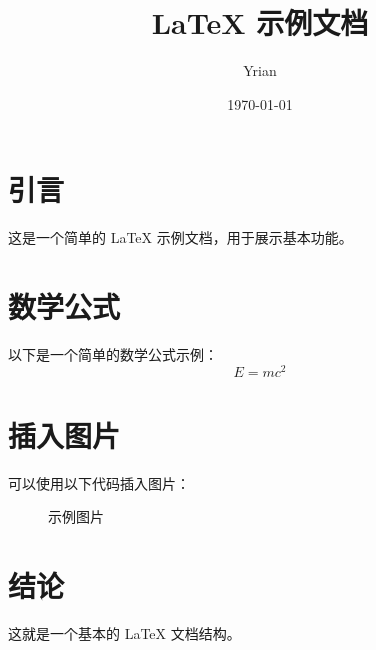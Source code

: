 \documentclass{ctexart}  %
\begin{document}
	\title{LaTeX 示例文档} %
	\author{Yrian}        %
	\date{\today}          %
	\maketitle              %
	
	\section{引言} %
	这是一个简单的 LaTeX 示例文档，用于展示基本功能\cite{shi_evolutionary_2024,mauro_real-time_2024}。
	
	\section{数学公式} %
	以下是一个简单的数学公式示例\cite{shi_evolutionary_2024,fan_advanced_2024}：
	\begin{equation} %
		E = mc^2 %
	\end{equation}
	
	\section{插入图片} %
	可以使用以下代码插入图片：
	\begin{figure}[h] %
		\centering %
		\caption{示例图片} %
		\label{fig:example} %
	\end{figure}
	
	\section{结论} %
	这就是一个基本的 LaTeX 文档结构。
	

\end{document}
